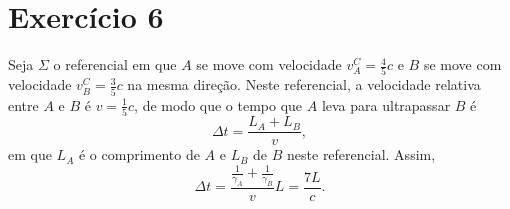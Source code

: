 \section*{Exercício 6}
Seja \(\Sigma\) o referencial em que \(A\) se move com velocidade \(v_A^C=\frac45c\) e \(B\) se move com velocidade \(v_B^C = \frac35c\) na mesma direção. Neste referencial, a velocidade relativa entre \(A\) e \(B\) é \(v = \frac15c\), de modo que o tempo que \(A\) leva para ultrapassar \(B\) é
\begin{equation*}
    \Delta t = \frac{L_A + L_B}{v},
\end{equation*}
em que \(L_A\) é o comprimento de \(A\) e \(L_B\) de \(B\) neste referencial. Assim,
\begin{equation*}
    \Delta t = \frac{\frac{1}{\gamma_A} + \frac{1}{\gamma_B}}{v}L = \frac{7L}{c}.
\end{equation*}
